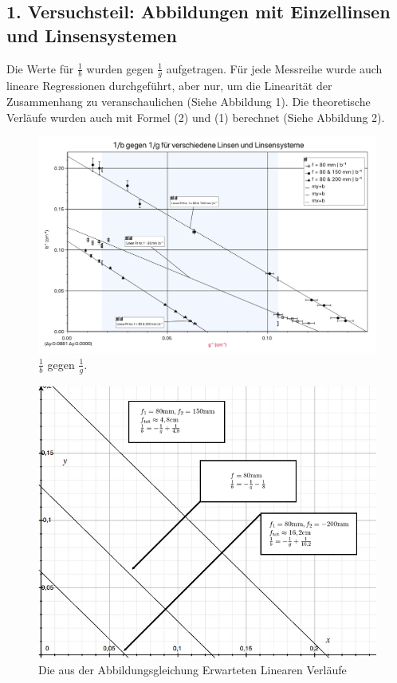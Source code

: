 \documentclass[11pt,a4paper]{article}
\begin{document}
\subsection{1. Versuchsteil: Abbildungen mit Einzellinsen und Linsensystemen}
Die Werte für $\frac{1}{b}$ wurden gegen $\frac{1}{g}$ aufgetragen. Für jede Messreihe wurde auch lineare Regressionen durchgeführt, aber nur, um die Linearität der Zusammenhang zu veranschaulichen (Siehe Abbildung 1). Die theoretische Verläufe wurden auch mit Formel (2) und (1) berechnet (Siehe Abbildung 2). 
\begin{figure}
	\centering
	\includegraphics[width=\linewidth]{Abb2}
	\caption{$\frac{1}{b}$ gegen $\frac{1}{g}$.}
\end{figure} 

\begin{figure}
	\centering
	\includegraphics[scale=0.5]{Abb3}
	\caption{ Die aus der Abbildungsgleichung Erwarteten Linearen Verläufe}
\end{figure} 
\end{document}

